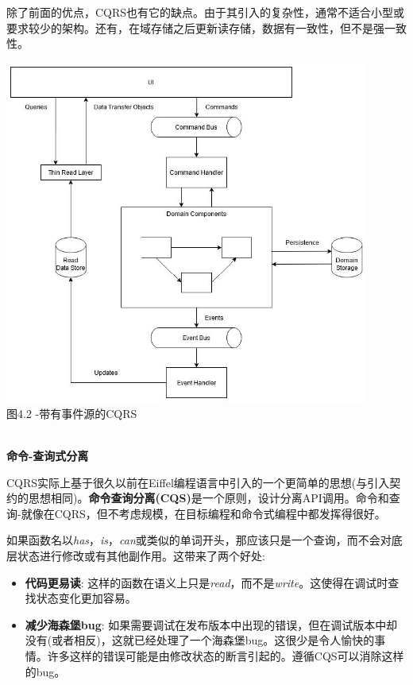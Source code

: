 除了前面的优点，CQRS也有它的缺点。由于其引入的复杂性，通常不适合小型或要求较少的架构。还有，在域存储之后更新读存储，数据有一致性，但不是强一致性。

\begin{center}
\includegraphics[width=0.9\textwidth]{content/2/chapter4/images/2.jpg}\\
图4.2 -带有事件源的CQRS
\end{center}

\hspace*{\fill} \\ %
\noindent
\textbf{命令-查询式分离}

CQRS实际上基于很久以前在Eiffel编程语言中引入的一个更简单的思想(与引入契约的思想相同)。\textbf{命令查询分离(CQS)}是一个原则，设计分离API调用。命令和查询-就像在CQRS，但不考虑规模，在目标编程和命令式编程中都发挥得很好。

如果函数名以\textit{has}，\textit{is}，\textit{can}或类似的单词开头，那应该只是一个查询，而不会对底层状态进行修改或有其他副作用。这带来了两个好处:

\begin{itemize}
\item 
\textbf{代码更易读}: 这样的函数在语义上只是\textit{read}，而不是\textit{write}。这使得在调试时查找状态变化更加容易。

\item 
\textbf{减少海森堡bug}: 如果需要调试在发布版本中出现的错误，但在调试版本中却没有(或者相反)，这就已经处理了一个海森堡bug。这很少是令人愉快的事情。许多这样的错误可能是由修改状态的断言引起的。遵循CQS可以消除这样的bug。
\end{itemize}

